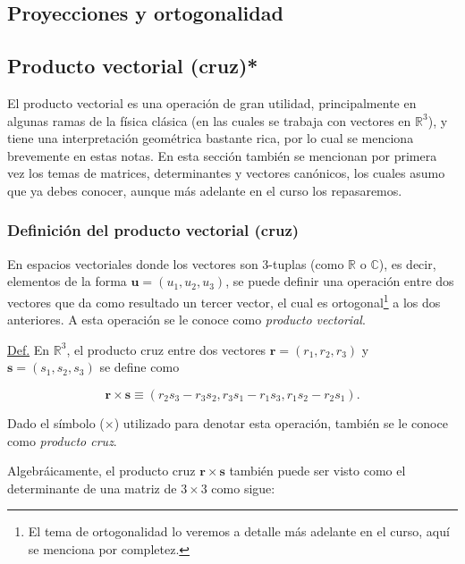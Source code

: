 \documentclass[12pt]{article}
\begin{document}
\newpage
\subsection{Proyecciones y ortogonalidad}







\newpage
\subsection{Producto vectorial (cruz)*} 

El producto vectorial es una operación de gran utilidad, principalmente en algunas ramas de la física clásica (en las cuales se trabaja con vectores en $\mathbb{R}^3$), y tiene una interpretación geométrica bastante rica, por lo cual se menciona brevemente en estas notas. En esta sección también se mencionan por primera vez los temas de matrices, determinantes y vectores canónicos, los cuales asumo que ya debes conocer, aunque más adelante en el curso los repasaremos.

\subsubsection{Definición del producto vectorial (cruz)} \label{Def:Producto_vectorial}

En espacios vectoriales donde los vectores son 3-tuplas (como $\mathbb{R}$ o $\mathbb{C}$), es decir, elementos de la forma $\mathbf{u}=(u_1,u_2,u_3)$, se puede definir una operación entre dos vectores que da como resultado un tercer vector, el cual es ortogonal\footnote{El tema de ortogonalidad lo veremos a detalle más adelante en el curso, aquí se menciona por completez.} a los dos anteriores. A esta operación se le conoce como \emph{producto vectorial}.

\begin{tcolorbox}
\underline{Def.} En $\mathbb{R}^3$, el producto cruz entre dos vectores $\mathbf{r}=(r_1,r_2,r_3)$ y $\mathbf{s}=(s_1,s_2,s_3)$ se define como

$$\mathbf{r}\times\mathbf{s} \equiv (r_2s_3-r_3s_2,r_3s_1-r_1s_3,r_1s_2-r_2s_1).$$

\noindent Dado el símbolo ($\times$) utilizado para denotar esta operación, también se le conoce como \emph{producto cruz}.
\end{tcolorbox}{}

Algebráicamente, el producto cruz $\mathbf{r}\times\mathbf{s}$ también puede ser visto como el determinante de una matriz de $3\times3$ como sigue:
\end{document}
